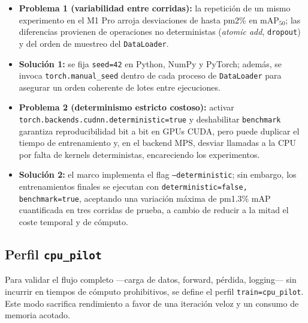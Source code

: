 \begin{itemize}
   \item \textbf{Problema 1 (variabilidad entre corridas):} la repetición de un mismo experimento en el M1 Pro arroja desviaciones de hasta pm2\% en \(\text{mAP}_{50}\); las diferencias provienen de operaciones no deterministas (\textit{atomic add}, \texttt{dropout}) y del orden de muestreo del \texttt{DataLoader}.
   \item \textbf{Solución 1:} se fija \texttt{seed=42} en Python, NumPy y PyTorch; además, se invoca \texttt{torch.manual\_seed} dentro de cada proceso de \texttt{DataLoader} para asegurar un orden coherente de lotes entre ejecuciones.
   \item \textbf{Problema 2 (determinismo estricto costoso):} activar \texttt{torch.backends.cudnn.deterministic=true} y deshabilitar \texttt{benchmark} garantiza reproducibilidad bit a bit en GPUs CUDA, pero puede duplicar el tiempo de entrenamiento y, en el backend MPS, desviar llamadas a la CPU por falta de kernels deterministas, encareciendo los experimentos.
   \item \textbf{Solución 2:} el marco implementa el flag \texttt{--deterministic}; sin embargo, los entrenamientos finales se ejecutan con \texttt{deterministic=false, benchmark=true}, aceptando una variación máxima de pm1.3\% mAP cuantificada en tres corridas de prueba, a cambio de reducir a la mitad el coste temporal y de cómputo.
\end{itemize}

\subsection{Perfil \texttt{cpu\_pilot}}\label{ssec:cpu_pilot}

Para validar el flujo completo —carga de datos, forward, pérdida, logging— sin incurrir en tiempos de cómputo prohibitivos, se define el perfil \texttt{train=cpu\_pilot}.
Este modo sacrifica rendimiento a favor de una iteración veloz y un consumo de memoria acotado.


